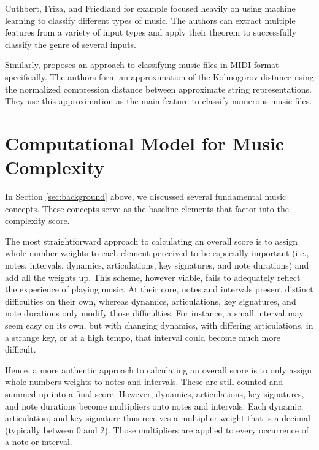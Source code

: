 \documentclass[10pt,preprint]{sigplanconf}
\begin{document}
Cuthbert, Friza, and Friedland \cite{Cuthbert2011} for example focused heavily on using machine learning to classify different types of music. The authors can extract multiple features from a variety of input types and apply their theorem to successfully classify the genre of several inputs.

Similarly, \cite{Cataltepe2007} proposes an approach to classifying music files in MIDI format specifically. The authors form an approximation of the Kolmogorov distance using the normalized compression distance between approximate string representations. They use this approximation as the main feature to classify numerous music files.


\section{Computational Model for Music Complexity} 
\label{sec:scoring}

In Section \ref{sec:background} above, we discussed several fundamental music concepts. These concepts serve as the baseline elements that factor into the complexity score. 



The most straightforward approach to calculating an overall score is to assign whole number weights to each element perceived to be especially important (i.e., notes, intervals, dynamics, articulations, key signatures, and note durations) and add all the weights up. This scheme, however viable, fails to adequately reflect the experience of playing music. At their core, notes and intervals present distinct difficulties on their own, whereas dynamics, articulations, key signatures, and note durations only modify those difficulties. For instance, a small interval may seem easy on its own, but with changing dynamics, with differing articulations, in a strange key, or at a high tempo, that interval could become much more difficult.

Hence, a more authentic approach to calculating an overall score is to only assign whole numbers weights to notes and intervals. These are still counted and summed up into a final score. However, dynamics, articulations, key signatures, and note durations become multipliers onto notes and intervals. Each dynamic, articulation, and key signature thus receives a multiplier weight that is a decimal (typically between 0 and 2). Those multipliers are applied to every occurrence of a note or interval. 
\end{document}
